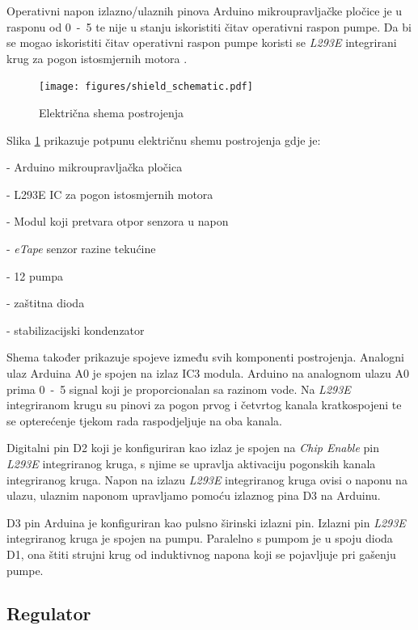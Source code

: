 Operativni napon izlazno/ulaznih pinova Arduino mikroupravljačke pločice je u
rasponu od \unit{0-5}{\volt} te nije u stanju iskoristiti čitav operativni
raspon pumpe. Da bi se mogao iskoristiti čitav operativni raspon pumpe koristi
se \emph{L293E} integrirani krug za pogon istosmjernih motora \cite{h-bridge}.

\begin{figure}[H]
\centering
\texttt{[image: figures/shield\_schematic.pdf]}
\caption{Električna shema postrojenja}
\label{fig:schematic}
\end{figure}

Slika \ref{fig:schematic} prikazuje potpunu električnu shemu postrojenja gdje
je:
\begin{description}[labelindent=2cm]
        \item[IC1] - Arduino mikroupravljačka pločica
        \item[IC2] - L293E IC za pogon istosmjernih motora
        \item[IC3] - Modul koji pretvara otpor senzora u napon
        \item[S]   - \emph{eTape} senzor razine tekućine
        \item[P]   - \unit{12}{\volt} pumpa
        \item[D1]  - zaštitna dioda
        \item[C1]  - stabilizacijski kondenzator
\end{description}

Shema također prikazuje spojeve između svih komponenti postrojenja. Analogni
ulaz Arduina A0 je spojen na izlaz IC3 modula. Arduino na analognom ulazu A0
prima \unit{0-5}{\volt} signal koji je proporcionalan sa razinom vode. Na
\emph{L293E} integriranom krugu su pinovi za pogon prvog i četvrtog kanala
kratkospojeni te se opterećenje tjekom rada raspodjeljuje na oba kanala.

Digitalni pin D2 koji je konfiguriran kao izlaz je spojen na \emph{Chip Enable}
pin \emph{L293E} integriranog kruga, s njime se upravlja aktivaciju pogonskih
kanala integriranog kruga. Napon na izlazu \emph{L293E} integriranog kruga ovisi
o naponu na ulazu, ulaznim naponom upravljamo pomoću izlaznog pina D3 na
Arduinu.

D3 pin Arduina je konfiguriran kao pulsno širinski izlazni pin. Izlazni
pin \emph{L293E} integriranog kruga je spojen na pumpu. Paralelno s pumpom je u
spoju dioda D1, ona štiti strujni krug od induktivnog napona koji se pojavljuje
pri gašenju pumpe.

\subsection{Regulator}

